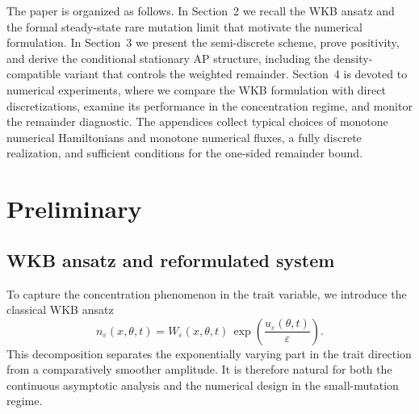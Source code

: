 \documentclass[11pt]{article}
\begin{document}
The paper is organized as follows. In Section~2 we recall the WKB ansatz and the formal steady-state rare mutation limit that motivate the numerical formulation. In Section~3 we present the semi-discrete scheme, prove positivity, and derive the conditional stationary AP structure, including the density-compatible variant that controls the weighted remainder. Section~4 is devoted to numerical experiments, where we compare the WKB formulation with direct discretizations, examine its performance in the concentration regime, and monitor the remainder diagnostic. The appendices collect typical choices of monotone numerical Hamiltonians and monotone numerical fluxes, a fully discrete realization, and sufficient conditions for the one-sided remainder bound.


\section{Preliminary}

\subsection{WKB ansatz and reformulated system}

To capture the concentration phenomenon in the trait variable, we introduce the classical WKB ansatz
\begin{equation}\label{eq:WKB}
   n_\varepsilon(x,\theta,t)
   = W_\varepsilon(x,\theta,t)\,
   \exp\!\left(\frac{u_\varepsilon(\theta,t)}{\varepsilon}\right).
\end{equation}
This decomposition separates the exponentially varying part in the trait direction from a comparatively smoother amplitude. It is therefore natural for both the continuous asymptotic analysis and the numerical design in the small-mutation regime.
\end{document}
